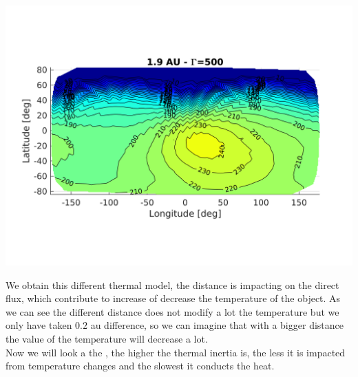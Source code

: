 \begin{center}
	\includegraphics[scale=1]{rsc/juventas_d1.9_g500.png}
\end{center}

We obtain this different thermal model, the distance is impacting on the direct flux, which contribute to increase of decrease the temperature of the object. As we can see the different distance does not modify a lot the temperature but we only have taken $0.2$ au difference, so we can imagine that with a bigger distance the value of the temperature will decrease a lot.\\[10pt]
Now we will look a the \Gamma, the higher the thermal inertia is, the less it is impacted from temperature changes and the slowest it conducts the heat.